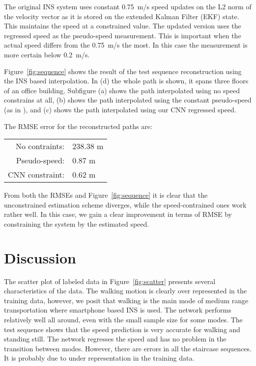 \documentclass{article}
\begin{document}
The original INS system uses constant 0.75~m/s speed updates on the L2 norm of the velocity vector  as it is stored on the extended Kalman Filter (EKF) state. This maintains the speed at a constrained value. The updated version uses the regressed speed as the pseudo-speed measurement. This is important when the actual speed differs from the 0.75~m/s the most. In this case the measurement is more certain below 0.2~m/s.

Figure~\ref{fig:sequence} shows the result of the test sequence reconstruction using the INS based interpolation. In (d) the whole path is shown, it spans three floors of an office building. Subfigure (a) shows the path interpolated using no speed constrains at all, (b) shows the path interpolated using the constant pseudo-speed (as in \cite{Solin+Cortes+Rahtu+Kannala}), and (c) shows the path interpolated using our CNN regressed speed. 



The RMSE error for the reconstructed paths are: \\
\vspace*{-1em}
\begin{center}
\begin{tabular}{rl}
  No contraints: & 238.38 m \\
  Pseudo-speed: & 0.87 m \\
  CNN constraint: & 0.62 m
\end{tabular}
\end{center}

From both the RMSEs and Figure~\ref{fig:sequence} it is clear that the unconstrained estimation scheme diverges, while the speed-contrained ones work rather well. In this case, we gain a clear improvement in terms of RMSE by constraining the system by the estimated  speed.



\section{Discussion}

The scatter plot of labeled data in Figure~\ref{fig:scatter} presents several characteristics of the data. The walking motion is clearly over represented in the training data, however, we posit that walking is the main mode of medium range transportation where smartphone  based INS is used. The network performs relatively well all around, even with the small sample size for some modes.
The test sequence shows that the speed prediction is very accurate for walking and standing still. The network regresses the speed and has no problem in the transition between modes. However, there are errors in all the staircase sequences. It is probably due to under representation in the training data.
\end{document}
